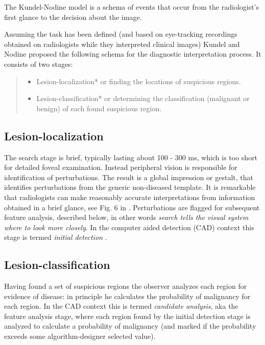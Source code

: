 \documentclass[
]{book}
\providecommand{\tightlist}{%
  \setlength{\itemsep}{0pt}\setlength{\parskip}{0pt}}
\begin{document}
The Kundel-Nodine model \citep{kundel2007holistic, kundel2004modeling} is a schema of events that occur from the radiologist's first glance to the decision about the image.

Assuming the task has been defined (and based on eye-tracking recordings obtained on radiologists while they interpreted clinical images) Kundel and Nodine proposed the following schema for the diagnostic interpretation process. It consists of two stages:

\begin{quote}
\begin{itemize}
\tightlist
\item
  Lesion-localization* or finding the locations of suspicious regions.
\item
  Lesion-classification* or determining the classification (malignant or benign) of each found suspicious region.
\end{itemize}
\end{quote}

\hypertarget{visual-search-glancing-global-impression}{%
\subsection{Lesion-localization}\label{visual-search-glancing-global-impression}}

The search stage is brief, typically lasting about 100 - 300 ms, which is too short for detailed foveal examination. Instead peripheral vision is responsible for identification of perturbations. The result is a global impression or gestalt, that identifies perturbations from the generic non-diseased template. It is remarkable that radiologists can make reasonably accurate interpretations from information obtained in a brief glance, see Fig. 6 in \citep{nodine1987using}. Perturbations are flagged for subsequent feature analysis, described below, in other words \emph{search tells the visual system where to look more closely}. In the computer aided detection (CAD) context this stage is termed \emph{initial detection} \citep{edwards2002maximum}.

\hypertarget{visual-search-scanning-local-feature-analysis}{%
\subsection{Lesion-classification}\label{visual-search-scanning-local-feature-analysis}}

Having found a set of suspicious regions the observer analyzes each region for evidence of disease: in principle he calculates the probability of malignancy for each region. In the CAD context this is termed \emph{candidate analysis}, aka the feature analysis stage, where each region found by the initial detection stage is analyzed to calculate a probability of malignancy (and marked if the probability exceeds some algorithm-designer selected value).
\end{document}
